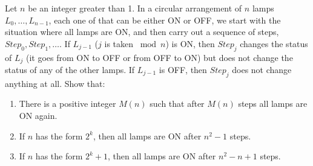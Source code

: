 Let $n$ be an integer greater than 1. In a circular arrangement of $n$ lamps $L_0, \ldots, L_{n-1}$, each one of that can be either ON or OFF, we start with the situation where all lamps are ON, and then carry out a sequence of steps, $Step_0, Step_1, \ldots$. If $L_{j-1}$ ($j$ is taken $\bmod n$) is ON, then $Step_j$ changes the status of $L_j$ (it goes from ON to OFF or from OFF to ON) but does not change the status of any of the other lamps. If $L_{j-1}$ is OFF, then $Step_j$ does not change anything at all. Show that:
\begin{enumerate}
\item[(a)] There is a positive integer $M(n)$ such that after $M(n)$ steps all lamps are ON again.
\item[(b)] If $n$ has the form $2^k$, then all lamps are ON after $n^2 - 1$ steps.
\item[(c)] If $n$ has the form $2^k + 1$, then all lamps are ON after $n^2 - n + 1$ steps.
\end{enumerate}

